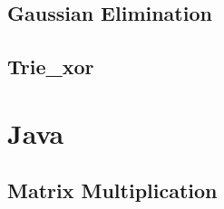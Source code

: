 \documentclass[12pt]{extarticle}
\begin{document}
\begin{multicols*}{2}
\subsection{Gaussian Elimination} %


% 

% 

\subsection{Trie_xor} %


% 

\section{Java} %

% 

%

%

\subsection{Matrix Multiplication}



\end{multicols*}
\end{document}

